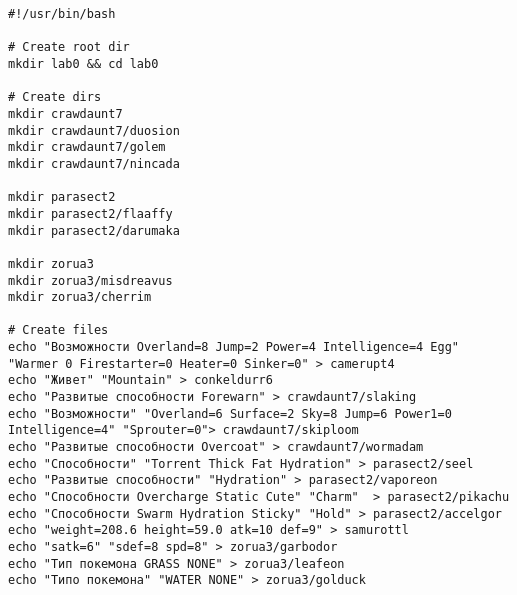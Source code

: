 \begin{verbatim}
#!/usr/bin/bash

# Create root dir
mkdir lab0 && cd lab0

# Create dirs
mkdir crawdaunt7
mkdir crawdaunt7/duosion
mkdir crawdaunt7/golem
mkdir crawdaunt7/nincada

mkdir parasect2
mkdir parasect2/flaaffy
mkdir parasect2/darumaka

mkdir zorua3
mkdir zorua3/misdreavus
mkdir zorua3/cherrim

# Create files
echo "Возможности Overland=8 Jump=2 Power=4 Intelligence=4 Egg" "Warmer 0 Firestarter=0 Heater=0 Sinker=0" > camerupt4
echo "Живет" "Mountain" > conkeldurr6
echo "Развитые способности Forewarn" > crawdaunt7/slaking
echo "Возможности" "Overland=6 Surface=2 Sky=8 Jump=6 Power1=0 Intelligence=4" "Sprouter=0"> crawdaunt7/skiploom
echo "Развитые способности Overcoat" > crawdaunt7/wormadam
echo "Способности" "Torrent Thick Fat Hydration" > parasect2/seel
echo "Развитые способности" "Hydration" > parasect2/vaporeon
echo "Способности Overcharge Static Cute" "Charm"  > parasect2/pikachu
echo "Способности Swarm Hydration Sticky" "Hold" > parasect2/accelgor
echo "weight=208.6 height=59.0 atk=10 def=9" > samurottl
echo "satk=6" "sdef=8 spd=8" > zorua3/garbodor
echo "Тип покемона GRASS NONE" > zorua3/leafeon
echo "Типо покемона" "WATER NONE" > zorua3/golduck
\end{verbatim}

